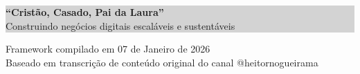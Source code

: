 \documentclass[12pt, a4paper]{article}
\begin{document}
\begin{center}
    \vspace{0.5cm}

    \colorbox{lightGray}{%
        \parbox{0.9\textwidth}{%
            \centering
            \vspace{0.4cm}
            \textcolor{primaryColor}{\large \textbf{``Cristão, Casado, Pai da Laura''}} \\
            \vspace{0.2cm}
            \textcolor{secondaryText}{\normalsize Construindo negócios digitais escaláveis e sustentáveis} \\
            \vspace{0.4cm}
        }%
    }

    \vfill

    \textcolor{secondaryText}{\footnotesize Framework compilado em 07 de Janeiro de 2026} \\
    \textcolor{secondaryText}{\footnotesize Baseado em transcrição de conteúdo original do canal @heitornogueirama}

\end{center}
\end{document}
